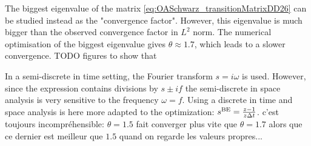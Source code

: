 The biggest eigenvalue of the matrix
\eqref{eq:OASchwarz_transitionMatrixDD26}
can be studied instead as the "convergence factor".
However, this eigenvalue is much bigger than the observed
convergence factor in $L^2$ norm. The numerical
optimisation of the biggest eigenvalue gives
$\theta \approx 1.7$, which leads to a slower convergence.
{\color{red} TODO figures to show that}
\begin{remark}
In a semi-discrete in time setting, the Fourier transform
$s=i\omega$ is used. However, since the expression contains
divisions by $s\pm if$ the semi-discrete in space analysis
is very sensitive to the frequency $\omega=f$. Using
a discrete in time and space analysis is here more adapted
to the optimization: $s^{\rm BE}=\frac{z-1}{z \Delta t}$.
	{\color{red} c'est toujours incompréhensible: $\theta=1.5$
	fait converger plus vite que $\theta=1.7$ alors que ce dernier
	est meilleur que $1.5$ quand on regarde les valeurs propres...}
\end{remark}



